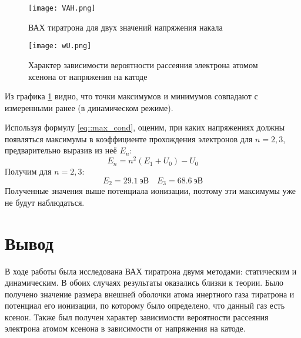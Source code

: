 \begin{figure}[h!]
  \centering
  \texttt{[image: VAH.png]}
  \caption{ВАХ тиратрона для двух значений напряжения накала}
  \label{img::VAH}
\end{figure}
\begin{figure}[h!]
  \centering
  \texttt{[image: wU.png]}
  \caption{Характер зависимости вероятности рассеяния электрона атомом ксенона от напряжения на катоде}
\end{figure}

Из графика \ref{img::VAH} видно, что точки максимумов и минимумов совпадают с
измеренными ранее (в динамическом режиме).

Используя формулу \eqref{eq::max_cond}, оценим, при каких напряжениях должны
появляться максимумы в коэффициенте прохождения электронов для $n = 2, 3$,
предварительно выразив из неё $E_n$:
\[
  E_n = n^2 \left(E_1 + U_0\right) - U_0
\]
Получим для $n = 2, 3$:
\[
  E_2 = 29.1 \: \text{эВ} \quad
  E_3 = 68.6 \: \text{эВ}
\]
Полученные значения выше потенциала ионизации, поэтому эти максимумы уже не
будут наблюдаться.

\section{Вывод}

В ходе работы была исследована ВАХ тиратрона двумя методами: статическим и
динамическим. В обоих случаях результаты оказались близки к теории. Было
получено значение размера внешней оболочки атома инертного газа тиратрона и
потенциал его ионизации, по которому было определено, что данный газ есть
ксенон. Также был получен характер зависимости вероятности рассеяния электрона
атомом ксенона  в зависимости от напряжения на катоде.
